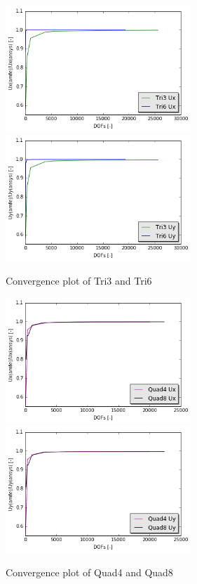 \begin{figure}[htbp]
	\begin{center}	
		\includegraphics[width=7cm,clip]{TriConPlotUx.png}
		\includegraphics[width=7cm,clip]{TriConPlotUy.png} 	 			
		\caption{Convergence plot of Tri3 and Tri6} \label{fig: TriConPlot}
	\end{center}
\end{figure}

\begin{figure}[htbp]
	\begin{center}	
		\includegraphics[width=7cm,clip]{QuadConPlotUx.png}
		\includegraphics[width=7cm,clip]{QuadConPlotUy.png} 	 			
		\caption{Convergence plot of Quad4 and Quad8} \label{fig: QuadConPlot}
	\end{center}
\end{figure}

